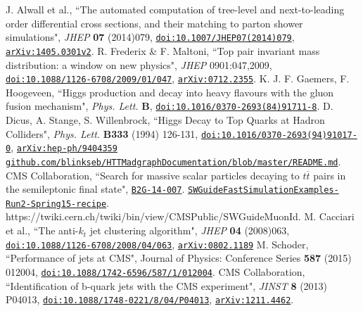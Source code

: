 \documentclass{cmspaper}
\begin{document}
\begin{thebibliography}{99}
J. Alwall et al., ``The automated computation of tree-level and next-to-leading order differential cross sections, and their matching to parton shower simulations", \textit{JHEP} \textbf{07} (2014)079, \href{http://link.springer.com/article/10.1007\%2FJHEP07\%282014\%29079}{\texttt{doi:10.1007/JHEP07(2014)079}}, \href{http://arxiv.org/abs/1405.0301}{\texttt{arXiv:1405.0301v2}}.
R. Frederix \& F. Maltoni, ``Top pair invariant mass distribution: a window on new physics", \textit{JHEP} 0901:047,2009, \href{http://iopscience.iop.org/article/10.1088/1126-6708/2009/01/047/meta;jsessionid=B54EB5B24AAF6EF0497D870A84C91AF3.c2.iopscience.cld.iop.org}{\texttt{doi:10.1088/1126-6708/2009/01/047}}, \href{http://arxiv.org/abs/0712.2355}{\texttt{arXiv:0712.2355}}.  
K. J. F. Gaemers, F. Hoogeveen, ``Higgs production and decay into heavy flavours with the gluon fusion mechanism", \textit{Phys. Lett.} \textbf{B}, \href{http://www.sciencedirect.com/science/article/pii/0370269384917118}{\texttt{doi:10.1016/0370-2693(84)91711-8}}.
D. Dicus, A. Stange, S. Willenbrock, ``Higgs Decay to Top Quarks at Hadron Colliders", \textit{Phys. Lett.} \textbf{B333} (1994) 126-131, \href{http://www.sciencedirect.com/science/article/pii/0370269394910170}{\texttt{doi:10.1016/0370-2693(94)91017-0}}, \href{http://arxiv.org/abs/hep-ph/9404359}{\texttt{arXiv:hep-ph/9404359}}
\href{https://github.com/blinkseb/HTTMadgraphDocumentation/blob/master/README.md}{\texttt{github.com/blinkseb/HTTMadgraphDocumentation/blob/master/README.md}}.
CMS Collaboration, ``Search for massive scalar particles decaying to $t\overline{t}$ pairs in the semileptonic final state", \href{http://cms.cern.ch/iCMS/analysisadmin/cadilines?line=B2G-14-007}{\texttt{B2G-14-007}}.
\href{https://twiki.cern.ch/twiki/bin/view/CMSPublic/SWGuideFastSimulationExamples#Run2\_Spring15\_recipe}{\texttt{SWGuideFastSimulationExamples-Run2-Spring15-recipe}}.
https://twiki.cern.ch/twiki/bin/view/CMSPublic/SWGuideMuonId.
M. Cacciari et al., ``The anti-$k_{t}$ jet clustering algorithm", \textit{JHEP} \textbf{04} (2008)063, \href{http://iopscience.iop.org/article/10.1088/1126-6708/2008/04/063/meta}{\texttt{doi:10.1088/1126-6708/2008/04/063}}, \href{http://arxiv.org/abs/0802.1189}{\texttt{arXiv:0802.1189}}
M. Schoder, ``Performance of jets at CMS", Journal of Physics: Conference Series \textbf{587} (2015) 012004, \href{http://iopscience.iop.org/article/10.1088/1742-6596/587/1/012004/meta}{\texttt{doi:10.1088/1742-6596/587/1/012004}}.
CMS Collaboration, ``Identification of b-quark jets with the CMS experiment", \textit{JINST} \textbf{8} (2013) P04013, \href{http://iopscience.iop.org/article/10.1088/1748-0221/8/04/P04013/meta}{\texttt{doi:10.1088/1748-0221/8/04/P04013}}, \href{http://arxiv.org/abs/1211.4462}{\texttt{arXiv:1211.4462}}.




 \end{thebibliography}
 
 
 

 
\end{document}
